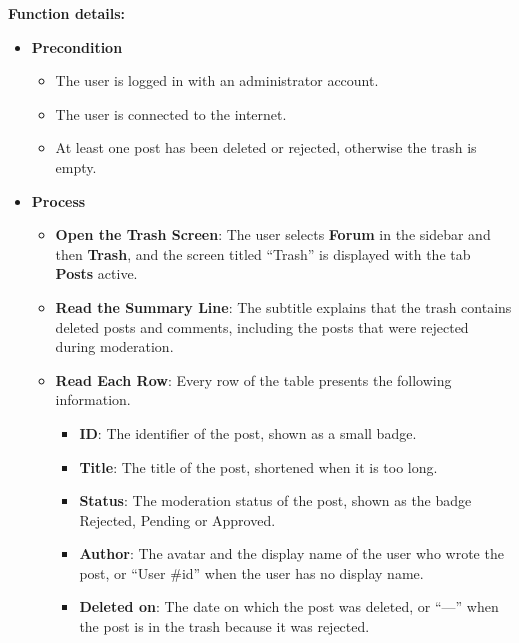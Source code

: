 \textbf{Function details:}
\begin{itemize}[leftmargin=1.6em,topsep=4pt,itemsep=3pt,parsep=0pt,label=$\bullet$]
    \item \textbf{Precondition}
        \begin{itemize}[leftmargin=2.2em,topsep=2pt,itemsep=3pt,parsep=0pt,label=$\circ$]
            \item The user is logged in with an administrator account.
            \item The user is connected to the internet.
            \item At least one post has been deleted or rejected, otherwise the trash is empty.
        \end{itemize}
    \item \textbf{Process}
        \begin{itemize}[leftmargin=2.2em,topsep=2pt,itemsep=3pt,parsep=0pt,label=$\circ$]
            \item \textbf{Open the Trash Screen}: The user selects \textbf{Forum} in the sidebar and then \textbf{Trash}, and the screen titled ``Trash'' is displayed with the tab \textbf{Posts} active.
            \item \textbf{Read the Summary Line}: The subtitle explains that the trash contains deleted posts and comments, including the posts that were rejected during moderation.
            \item \textbf{Read Each Row}: Every row of the table presents the following information.
                \begin{itemize}[leftmargin=2.2em,topsep=2pt,itemsep=3pt,parsep=0pt,label=$\blacksquare$]
                    \item \textbf{ID}: The identifier of the post, shown as a small badge.
                    \item \textbf{Title}: The title of the post, shortened when it is too long.
                    \item \textbf{Status}: The moderation status of the post, shown as the badge Rejected, Pending or Approved.
                    \item \textbf{Author}: The avatar and the display name of the user who wrote the post, or ``User \#id'' when the user has no display name.
                    \item \textbf{Deleted on}: The date on which the post was deleted, or ``---'' when the post is in the trash because it was rejected.
                \end{itemize}

\end{itemize}
\end{itemize}
